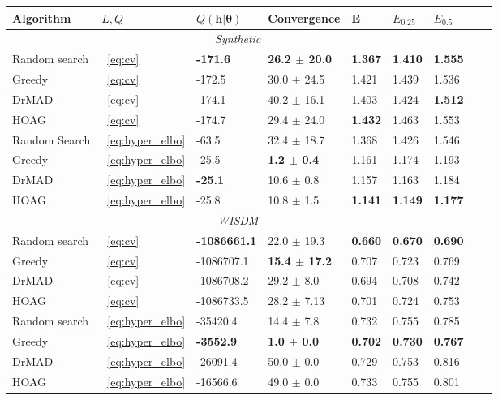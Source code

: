 \begin{table}
\small
\begin{tabularx}{\textwidth}{ |X|X|X|X|X|X|X|X|X|}

\hline
\textbf{Algorithm} & $L, Q$  & $Q(\mathbf{h}| \boldsymbol{\theta} )$ & Convergence & E & $E_{0.25}$ & $E_{0.5}$\\ 
\hline
\multicolumn{7}{|c|}{\textit{Synthetic}}  \\
\hline
Random search & ~\eqref{eq:cv} & \bf -171.6  &\bf 26.2 $\pm$ 20.0  & \bf 1.367 &\bf 1.410 &\bf 1.555 \\
\hline
Greedy & ~\eqref{eq:cv} & -172.5 & 30.0 $\pm$ 24.5 & 1.421 & 1.439 &  1.536\\
\hline
DrMAD & ~\eqref{eq:cv} & -174.1 & 40.2 $\pm$ 16.1 &  1.403 & 1.424 & \bf 1.512 \\
\hline
HOAG & ~\eqref{eq:cv} &-174.7 & 29.4 $\pm$ 24.0 &   \bf 1.432  & 1.463 & 1.553\\
\hline
Random Search & ~\eqref{eq:hyper_elbo} & -63.5  & 32.4 $\pm$ 18.7  & 1.368 & 1.426 & 1.546  \\
\hline
Greedy & ~\eqref{eq:hyper_elbo} & -25.5 & \bf 1.2 $\pm$ 0.4 & 1.161 & 1.174 & 1.193\\
\hline
DrMAD & ~\eqref{eq:hyper_elbo} & \bf -25.1 &  10.6 $\pm$ 0.8 &  1.157 & 1.163 &  1.184\\
\hline
HOAG & ~\eqref{eq:hyper_elbo} &-25.8 & 10.8 $\pm$ 1.5&   \bf 1.141  & \bf 1.149 & \bf 1.177\\
\hline


\multicolumn{7}{|c|}{\textit{WISDM}}  \\
\hline
Random search & ~\eqref{eq:cv} & \bf -1086661.1  & 22.0 $\pm$ 19.3  & \bf 0.660 & \bf 0.670 & \bf 0.690  \\
\hline
Greedy & ~\eqref{eq:cv} & -1086707.1 & \bf 15.4 $\pm$ 17.2 & 0.707 &  0.723  &  0.769\\
\hline
DrMAD & ~\eqref{eq:cv} & -1086708.2 & 29.2 $\pm$ 8.0 &  0.694 &  0.708 & 0.742 \\
\hline
HOAG & ~\eqref{eq:cv} & -1086733.5 & 28.2 $\pm$ 7.13&   0.701 & 0.724 & 0.753 \\
\hline
Random search & ~\eqref{eq:hyper_elbo} & -35420.4 &   14.4 $\pm$ 7.8  &   0.732 &   0.755 & 0.785 \\
\hline
Greedy & ~\eqref{eq:hyper_elbo} & \bf -3552.9 &\bf 1.0 $\pm$ 0.0  &   \bf 0.702 & \bf 0.730  &  \bf 0.767\\
\hline
DrMAD & ~\eqref{eq:hyper_elbo} & -26091.4 &   50.0 $\pm$ 0.0  & 0.729 &  0.753 & 0.816 \\
\hline
HOAG & ~\eqref{eq:hyper_elbo} &  -16566.6 & 49.0 $\pm$ 0.0  &  0.733 &  0.755 &  0.801 \\
\hline




\end{tabularx}
\end{table}
